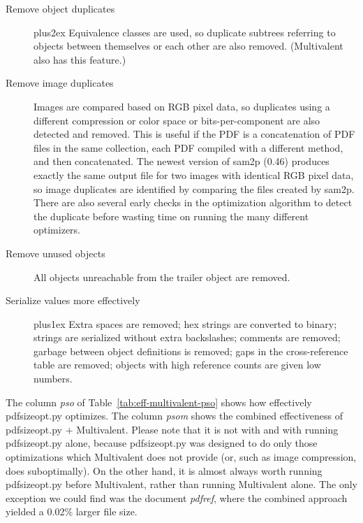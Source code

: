 \documentclass{ltugproc}
\def\cmd{\textsf}
\begin{document}
\begin{description}
\item[Remove object duplicates]
\vrule width0pt\hskip0pt plus2ex  %
Equivalence classes are used, so duplicate subtrees referring
to objects between themselves or each other are also removed. (Multivalent
also has this feature.)

\item[Remove image duplicates]
Images are compared based on RGB pixel data, so duplicates using a different
compression or color space or bits-per-component are also detected and
removed. This is useful if the PDF is a concatenation of PDF files in the same
collection, each PDF compiled with a different method, and then concatenated.
The newest version of \cmd{sam2p} (0.46) produces exactly the same output
file for two images with identical RGB pixel data, so image duplicates are
identified by comparing the files created by \cmd{sam2p}. There are also
several early checks in the optimization algorithm to detect the duplicate
before wasting time on running the many different optimizers.

\item[Remove unused objects]
All objects unreachable from the trailer object are removed.

\item[Serialize values more effectively]
\vrule width0pt\hskip0pt plus1ex  %
Extra spaces are removed;
hex strings are converted to binary;
strings are serialized without extra backslashes;
comments are removed;
garbage between object definitions is removed;
gaps in the cross-reference table are removed;
objects with high reference counts are given low numbers.

\end{description}

The column \emph{pso} of Table~\ref{tab:eff-multivalent-pso} shows how
effectively \cmd{pdfsizeopt.py} optimizes. The column \emph{psom} shows the
combined effectiveness of \cmd{pdfsizeopt.py} $+$ Multivalent. Please note
that it is not with and with running \cmd{pdfsizeopt.py} alone, because
\cmd{pdfsizeopt.py} was designed to do only those optimizations which
Multivalent does not provide (or, such as image compression, does
suboptimally). On the other hand, it is almost always worth running
\cmd{pdfsizeopt.py} before Multivalent, rather than running Multivalent
alone. The only exception we could find was the document \emph{pdfref},
where the combined approach yielded a 0.02\% larger file size.
\end{document}
